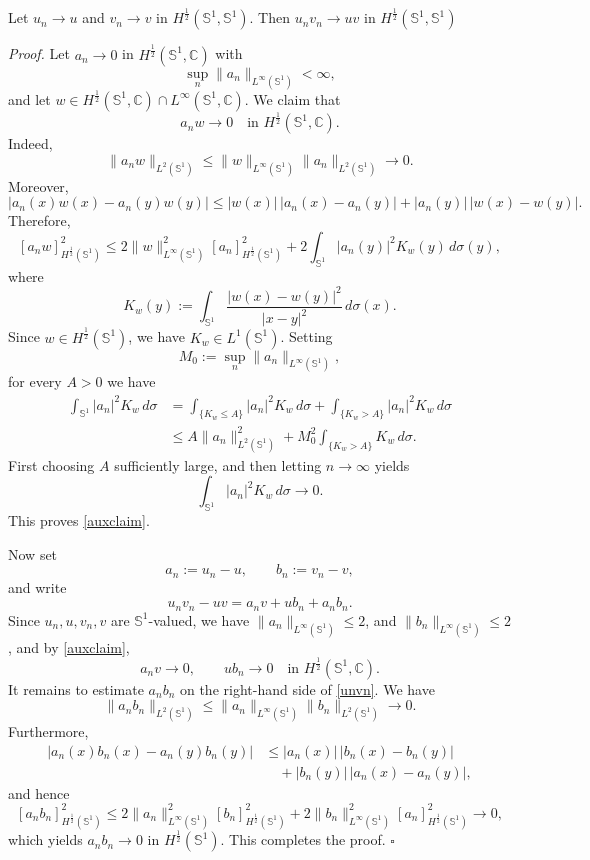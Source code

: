 \documentclass[10pt,a4paper]{amsart}
\newenvironment{proof}{\noindent\emph{Proof.}}{\hfill$\square$\medskip}
\newcommand{\sph}{\mathbb{S}}
\begin{document}
\begin{lem}\label{lemunvn}
Let $u_n\to u$ and $v_n\to v$ in $H^{\frac12}(\sph^1,\sph^1)$.
Then
$ u_nv_n\to uv$ in $H^{\frac12}(\sph^1,\sph^1)$
\end{lem}

\begin{proof}
Let $a_n\to 0$  in
$H^{\frac12}(\sph^1,\mathbb C)$ with
\[
\sup_n\|a_n\|_{L^\infty(\sph^1)}<\infty,
\]
and let $w\in H^{\frac12}(\sph^1,\mathbb C)\cap L^\infty(\sph^1,\mathbb C)$.
We claim that
\begin{equation}\label{auxclaim}
a_nw\to0
\quad\text{in }H^{\frac12}(\sph^1,\mathbb C).
\end{equation}
Indeed,
\[
\|a_nw\|_{L^2(\sph^1)}
\le
\|w\|_{L^\infty(\sph^1)}\|a_n\|_{L^2(\sph^1)}
\to0.
\]
Moreover,
\[
|a_n(x)w(x)-a_n(y)w(y)|
\le
|w(x)|\,|a_n(x)-a_n(y)| +
|a_n(y)|\,|w(x)-w(y)|.
\]
Therefore,
\[
[a_nw]_{H^{\frac12}(\sph^1)}^2
\le
2\|w\|_{L^\infty(\sph^1)}^2[a_n]_{H^{\frac12}(\sph^1)}^2
+
2\int_{\sph^1}|a_n(y)|^2K_w(y)\,d\sigma(y),
\]
where
\[
K_w(y)
:=
\int_{\sph^1}
\frac{|w(x)-w(y)|^2}{|x-y|^2}\,d\sigma(x).
\]
Since $w\in H^{\frac12}(\sph^1)$, we have $K_w\in L^1(\sph^1)$. Setting
\[
M_0:=\sup_n\|a_n\|_{L^\infty(\sph^1)},
\]
for every $A>0$ we have
\[
\begin{aligned}
\int_{\sph^1}|a_n|^2K_w\,d\sigma
&=
\int_{\{K_w\le A\}}|a_n|^2K_w\,d\sigma
+
\int_{\{K_w>A\}}|a_n|^2K_w\,d\sigma \\
&\le
A\|a_n\|_{L^2(\sph^1)}^2
+
M_0^2\int_{\{K_w>A\}}K_w\,d\sigma.
\end{aligned}
\]
First choosing $A$ sufficiently large, and then letting $n\to\infty$ yields
\[
\int_{\sph^1}|a_n|^2K_w\,d\sigma\to0.
\]
This proves \eqref{auxclaim}.

Now set
\[
a_n:=u_n-u,
\qquad
b_n:=v_n-v,
\]
and write
\begin{equation}\label{unvn}
u_nv_n-uv
=
a_nv+ub_n+a_nb_n.
\end{equation}
Since $u_n,u,v_n,v$ are $\sph^1$-valued, we have
$\|a_n\|_{L^\infty(\sph^1)}
\le2$,
and $\|b_n\|_{L^\infty(\sph^1)}
\le2$, and by \eqref{auxclaim},
\[
a_nv\to0,
\qquad
ub_n\to0
\quad\text{in }H^{\frac12}(\sph^1,\mathbb{C}).
\]
It remains to estimate $a_nb_n$ on the right-hand side of \eqref{unvn}. We have
\[
\|a_nb_n\|_{L^2(\sph^1)}
\le
\|a_n\|_{L^\infty(\sph^1)}\|b_n\|_{L^2(\sph^1)}
\to0.
\]
Furthermore,
\[
\begin{aligned}
|a_n(x)b_n(x)-a_n(y)b_n(y)|
&\le
|a_n(x)|\,|b_n(x)-b_n(y)| \\
&\quad+
|b_n(y)|\,|a_n(x)-a_n(y)|,
\end{aligned}
\]
and hence
\[
[a_nb_n]_{H^{\frac12}(\sph^1)}^2
\le
2\|a_n\|_{L^\infty(\sph^1)}^2[b_n]_{H^{\frac12}(\sph^1)}^2
+
2\|b_n\|_{L^\infty(\sph^1)}^2[a_n]_{H^{\frac12}(\sph^1)}^2
\to0,
\]
which yields $a_nb_n\to0$ in $H^{\frac12}(\sph^1)$. This completes the proof.
\end{proof}
\end{document}
